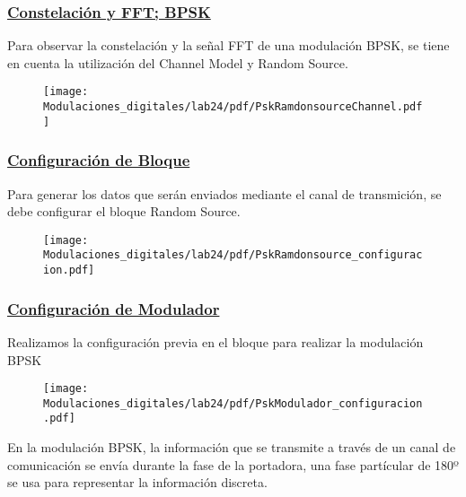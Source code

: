 \begin{frame}
   
  \frametitle{\underline{\textbf{Constelación y FFT; BPSK}}}
   \begin{flushleft}
 Para observar la constelación y la señal FFT de una modulación BPSK, se tiene en cuenta la utilización del Channel Model y Random Source.
   \end{flushleft}
   \begin{figure}[H]
   \centering
   \vspace{-3mm}
  \texttt{[image: Modulaciones\_digitales/lab24/pdf/PskRamdonsourceChannel.pdf]} 
   \end{figure}
\end{frame}

 \begin{frame}
   
  \frametitle{\underline{\textbf{Configuración de Bloque}}}
   \begin{flushleft}
   Para generar los datos que serán enviados mediante el canal de transmición, se debe configurar el bloque Random Source. 
   \end{flushleft}
   \begin{figure}[H]
   \centering
   \vspace{-3mm}
  \texttt{[image: Modulaciones\_digitales/lab24/pdf/PskRamdonsource\_configuracion.pdf]} 
   \end{figure}
 \end{frame}

 \begin{frame}
   
  \frametitle{\underline{\textbf{Configuración de Modulador}}}
 
   \begin{flushleft}
  Realizamos la configuración previa en el bloque para realizar la modulación BPSK
   \end{flushleft}
   \begin{figure}[H]
   \centering
   \vspace{-3mm}
   \texttt{[image: Modulaciones\_digitales/lab24/pdf/PskModulador\_configuracion.pdf]} 
   \end{figure}
   \begin{flushleft}
  En la modulación BPSK, la información que se transmite a través de un canal de    comunicación se envía durante la fase de la portadora, una fase partícular de 180º se usa para representar la información discreta.
  \end{flushleft}  
 \end{frame}

